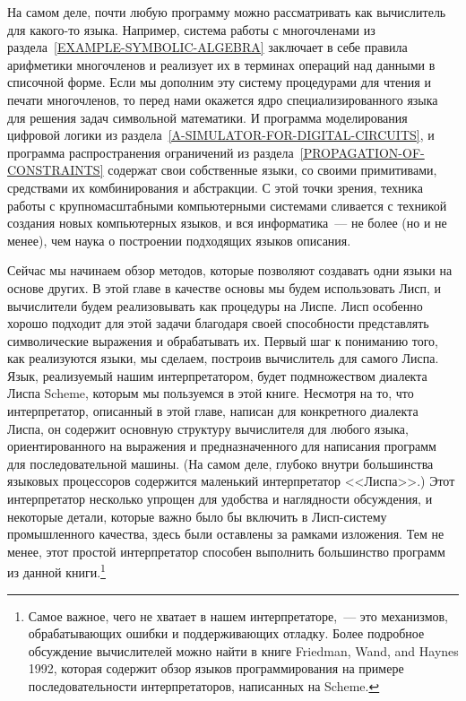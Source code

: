 На самом деле, почти любую программу можно рассматривать как
вычислитель для какого-то языка.  Например, система работы с
многочленами из раздела~\ref{EXAMPLE-SYMBOLIC-ALGEBRA}
заключает в себе правила арифметики многочленов и реализует их в
терминах операций над данными в списочной форме.  Если мы дополним 
эту
систему процедурами для чтения и печати многочленов, то перед нами
окажется ядро специализированного языка для решения задач
символьной математики.  И программа моделирования цифровой логики из
раздела~\ref{A-SIMULATOR-FOR-DIGITAL-CIRCUITS}, и программа
распространения ограничений из 
раздела~\ref{PROPAGATION-OF-CONSTRAINTS} содержат свои
собственные языки, со своими примитивами, средствами их комбинирования
и абстракции.  С этой точки зрения, техника работы с
крупномасштабными компьютерными системами сливается с техникой
создания новых компьютерных языков, и вся 
информатика~--- не более (но и не менее), чем 
наука о построении подходящих языков описания.

Сейчас мы начинаем обзор методов, которые позволяют создавать
одни языки на основе других. В этой главе в качестве основы мы будем
использовать Лисп,  и вычислители будем реализовывать как процедуры 
на Лиспе.  Лисп особенно хорошо подходит для этой задачи благодаря
своей способности представлять символические выражения и обрабатывать
их.  Первый шаг к пониманию того, как реализуются языки, мы сделаем,
построив вычислитель для самого Лиспа.  Язык, реализуемый нашим
интерпретатором, будет подмножеством диалекта Лиспа Scheme, которым мы
пользуемся в этой книге.  Несмотря на то, что интерпретатор, описанный в
этой главе, написан для конкретного диалекта Лиспа, он содержит
основную структуру вычислителя для любого языка, ориентированного на
выражения и предназначенного для написания программ для
последовательной машины.  (На самом деле, глубоко внутри большинства
языковых процессоров содержится маленький интерпретатор <<Лиспа>>.)  Этот
интерпретатор несколько упрощен для удобства и наглядности обсуждения, и
некоторые детали, которые важно было бы включить в Лисп-систему
промышленного качества, здесь были оставлены за рамками изложения.  Тем не 
менее, этот простой интерпретатор способен выполнить большинство программ 
из данной книги.\footnote{Самое важное, чего не хватает в нашем 
интерпретаторе,~---
это механизмов, обрабатывающих ошибки и поддерживающих отладку.  Более
подробное обсуждение вычислителей можно найти в книге 
Friedman, Wand, and Haynes 1992, которая содержит обзор
языков программирования на примере последовательности интерпретаторов,
написанных на Scheme.}

